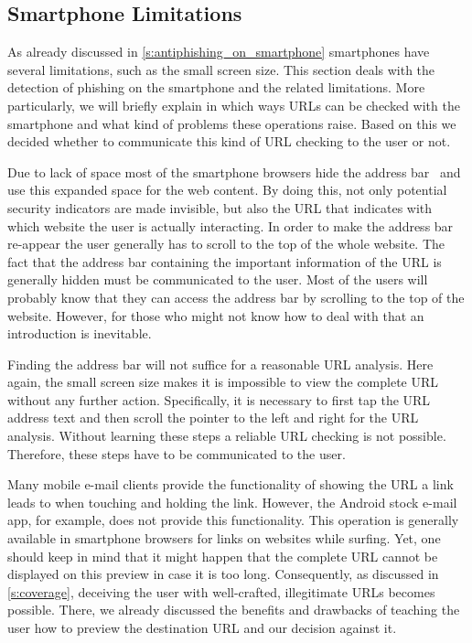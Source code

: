 \subsection{Smartphone Limitations}
As already discussed in \autoref{s:antiphishing_on_smartphone} smartphones have several limitations, such as the small screen size. 
This section deals with the detection of phishing on the smartphone and the related limitations.
More particularly, we will briefly explain in which ways URLs can be checked with the smartphone and what kind of problems these operations raise.
Based on this we decided whether to communicate this kind of URL checking to the user or not.

\begin{description}[leftmargin=0cm]
	\item[Invisible Address Bar] Due to lack of space most of the smartphone browsers hide the address bar~\cite{amrutkar2012measuring} and use this expanded space for the web content. 
By doing this, not only potential security indicators are made invisible, but also the URL that indicates with which website the user is actually interacting.
In order to make the address bar re-appear the user generally has to scroll to the top of the whole website.
The fact that the address bar containing the important information of the URL is generally hidden must be communicated to the user.
Most of the users will probably know that they can access the address bar by scrolling to the top of the website.
However, for those who might not know how to deal with that an introduction is inevitable.

	\item[Analyze Complete URL Via Address Bar] Finding the address bar will not suffice for a reasonable URL analysis. 
Here again, the small screen size makes it is impossible to view the complete URL without any further action.
Specifically, it is necessary to first tap the URL address text and then scroll the pointer to the left and right for the URL analysis.
Without learning these steps a reliable URL checking is not possible. 
Therefore, these steps have to be communicated to the user.

	\item[Show URL Before Click - Preview] Many mobile e-mail clients provide the functionality of showing the URL a link leads to when touching and holding the link.
However, the Android stock e-mail app, for example, does not provide this functionality.
This operation is generally available in smartphone browsers for links on websites while surfing.
Yet, one should keep in mind that it might happen that the complete URL cannot be displayed on this preview in case it is too long. 
Consequently, as discussed in \autoref{s:coverage}, deceiving the user with well-crafted, illegitimate URLs becomes possible. 
There, we already discussed the benefits and drawbacks of teaching the user how to preview the destination URL and our decision against it.


\end{description}
